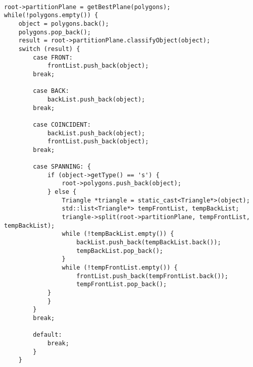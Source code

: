\begin{lstlisting}

root->partitionPlane = getBestPlane(polygons);
while(!polygons.empty()) {
    object = polygons.back();
    polygons.pop_back();
    result = root->partitionPlane.classifyObject(object);
    switch (result) {
        case FRONT:
            frontList.push_back(object);
        break;

        case BACK:
            backList.push_back(object);
        break;

        case COINCIDENT:
            backList.push_back(object);
            frontList.push_back(object);
        break;

        case SPANNING: {
            if (object->getType() == 's') {
                root->polygons.push_back(object);
            } else {
                Triangle *triangle = static_cast<Triangle*>(object);
                std::list<Triangle*> tempFrontList, tempBackList;
                triangle->split(root->partitionPlane, tempFrontList, tempBackList);
                while (!tempBackList.empty()) {
                    backList.push_back(tempBackList.back());
                    tempBackList.pop_back();
                }
                while (!tempFrontList.empty()) {
                    frontList.push_back(tempFrontList.back());
                    tempFrontList.pop_back();
            }
            }
        }
        break;

        default:
            break;
        }
    }
\end{lstlisting}

